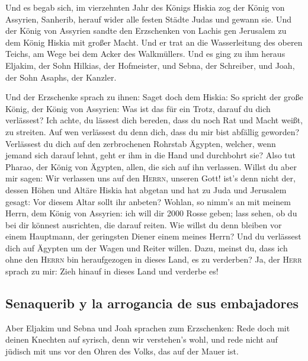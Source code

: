  Und es begab sich, im vierzehnten Jahr des Königs Hiskia
zog der König von Assyrien, Sanherib, herauf wider alle festen Städte
Judas und gewann sie.  Und der König von Assyrien sandte
den Erzschenken von Lachis gen Jerusalem zu dem König Hiskia mit großer
Macht. Und er trat an die Wasserleitung des oberen Teichs, am Wege bei
dem Acker des Walkmüllers.  Und es ging zu ihm heraus
Eljakim, der Sohn Hilkias, der Hofmeister, und Sebna, der Schreiber, und
Joah, der Sohn Asaphs, der Kanzler.

 Und der Erzschenke sprach zu ihnen: Saget doch dem
Hiskia: So spricht der große König, der König von Assyrien: Was ist das
für ein Trotz, darauf du dich verlässest?  Ich achte, du
lässest dich bereden, dass du noch Rat und Macht weißt, zu streiten. Auf
wen verlässest du denn dich, dass du mir bist abfällig geworden?
 Verlässest du dich auf den zerbrochenen Rohrstab Ägypten,
welcher, wenn jemand sich darauf lehnt, geht er ihm in die Hand und
durchbohrt sie? Also tut Pharao, der König von Ägypten, allen, die sich
auf ihn verlassen.  Willst du aber mir sagen: Wir
verlassen uns auf den \textsc{Herrn}, unseren Gott! ist's denn nicht
der, dessen Höhen und Altäre Hiskia hat abgetan und hat zu Juda und
Jerusalem gesagt: Vor diesem Altar sollt ihr anbeten? 
Wohlan, so nimm's an mit meinem Herrn, dem König von Assyrien: ich will
dir 2000 Rosse geben; lass sehen, ob du bei dir könnest ausrichten, die
darauf reiten.  Wie willst du denn bleiben vor einem
Hauptmann, der geringsten Diener einem meines Herrn? Und du verlässest
dich auf Ägypten um der Wagen und Reiter willen.  Dazu,
meinst du, dass ich ohne den \textsc{Herrn} bin heraufgezogen in dieses
Land, es zu verderben? Ja, der \textsc{Herr} sprach zu mir: Zieh hinauf
in dieses Land und verderbe es!

\hypertarget{senaquerib-y-la-arrogancia-de-sus-embajadores}{%
\subsection{Senaquerib y la arrogancia de sus
embajadores}\label{senaquerib-y-la-arrogancia-de-sus-embajadores}}

 Aber Eljakim und Sebna und Joah sprachen zum
Erzschenken: Rede doch mit deinen Knechten auf syrisch, denn wir
verstehen's wohl, und rede nicht auf jüdisch mit uns vor den Ohren des
Volks, das auf der Mauer ist.


